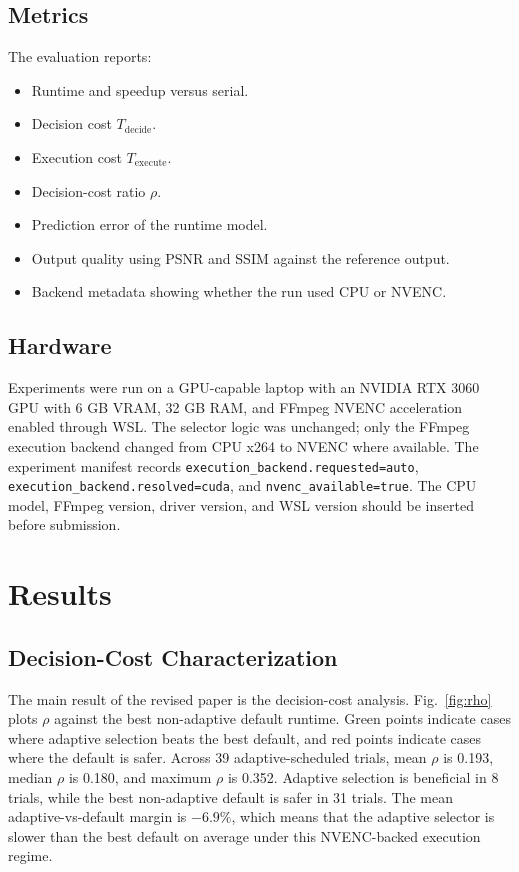 \documentclass[conference]{IEEEtran}
\newcommand{\MeanRho}{0.193}
\newcommand{\MedianRho}{0.180}
\newcommand{\MaxRho}{0.352}
\newcommand{\BeneficialCount}{8}
\newcommand{\DefaultSaferCount}{31}
\begin{document}
\subsection{Metrics}

The evaluation reports:
\begin{itemize}
\item Runtime and speedup versus serial.
\item Decision cost $T_{\mathrm{decide}}$.
\item Execution cost $T_{\mathrm{execute}}$.
\item Decision-cost ratio $\rho$.
\item Prediction error of the runtime model.
\item Output quality using PSNR and SSIM against the reference output.
\item Backend metadata showing whether the run used CPU or NVENC.
\end{itemize}

\subsection{Hardware}

Experiments were run on a GPU-capable laptop with an NVIDIA RTX 3060 GPU with 6 GB VRAM, 32 GB RAM, and FFmpeg NVENC acceleration enabled through WSL.
The selector logic was unchanged; only the FFmpeg execution backend changed from CPU x264 to NVENC where available.
The experiment manifest records \texttt{execution\_backend.requested=auto}, \texttt{execution\_backend.resolved=cuda}, and \texttt{nvenc\_available=true}.
The CPU model, FFmpeg version, driver version, and WSL version should be inserted before submission.

\section{Results}

\subsection{Decision-Cost Characterization}

The main result of the revised paper is the decision-cost analysis.
Fig.~\ref{fig:rho} plots $\rho$ against the best non-adaptive default runtime.
Green points indicate cases where adaptive selection beats the best default, and red points indicate cases where the default is safer.
Across 39 adaptive-scheduled trials, mean $\rho$ is \MeanRho{}, median $\rho$ is \MedianRho{}, and maximum $\rho$ is \MaxRho{}.
Adaptive selection is beneficial in \BeneficialCount{} trials, while the best non-adaptive default is safer in \DefaultSaferCount{} trials.
The mean adaptive-vs-default margin is $-6.9\%$, which means that the adaptive selector is slower than the best default on average under this NVENC-backed execution regime.
\end{document}
